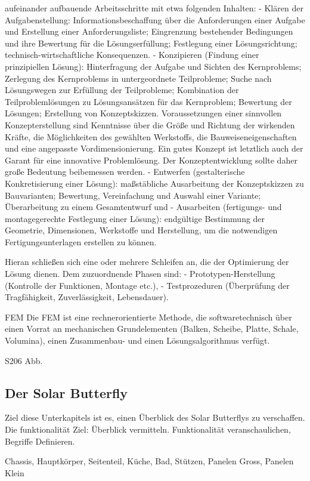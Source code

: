 aufeinander aufbauende Arbeitsschritte mit etwa folgenden Inhalten:
  - Klären der Aufgabenstellung: Informationsbeschaffung über die Anforderungen einer Aufgabe und Erstellung einer Anforderungsliste; Eingrenzung bestehender Bedingungen und ihre Bewertung für die Lösungserfüllung; Festlegung einer Lösungsrichtung; technisch-wirtschaftliche Konsequenzen.
  - Konzipieren (Findung einer prinzipiellen Lösung): Hinterfragung der Aufgabe und Sichten des Kernproblems; Zerlegung des Kernproblems in untergeordnete Teilprobleme; Suche nach Lösungswegen zur Erfüllung der Teilprobleme; Kombination der Teilproblemlösungen zu Lösungsansätzen für das Kernproblem; Bewertung der Lösungen; Erstellung von Konzeptskizzen. Voraussetzungen einer sinnvollen Konzepterstellung sind Kenntnisse über die Größe und Richtung der wirkenden Kräfte, die Möglichkeiten des gewählten Werkstoffs, die Bauweiseneigenschaften und eine angepasste Vordimensionierung. Ein gutes Konzept ist letztlich auch der Garant für eine innovative Problemlösung. Der Konzeptentwicklung sollte daher große Bedeutung beibemessen werden.
  - Entwerfen (gestalterische Konkretisierung einer Lösung): maßstäbliche Ausarbeitung der Konzeptskizzen zu Bauvarianten; Bewertung, Vereinfachung und Auswahl einer Variante; Überarbeitung zu einem Gesamtentwurf und
  - Ausarbeiten (fertigungs- und montagegerechte Festlegung einer Lösung): endgültige Bestimmung der Geometrie, Dimensionen, Werkstoffe und Herstellung, um die notwendigen Fertigungsunterlagen erstellen zu können.

Hieran schließen sich eine oder mehrere Schleifen an, die der Optimierung der Lösung dienen. Dem zuzuordnende Phasen sind:
  - Prototypen-Herstellung (Kontrolle der Funktionen, Montage etc.),
  - Testprozeduren (Überprüfung der Tragfähigkeit, Zuverlässigkeit, Lebensdauer).

FEM
  Die FEM ist eine rechnerorientierte Methode, die softwaretechnisch über einen Vorrat an mechanischen Grundelementen (Balken, Scheibe, Platte, Schale, Volumina), einen Zusammenbau- und einen Lösungsalgorithmus verfügt.

S206 Abb.

\subsection{Der Solar Butterfly}
Ziel diese Unterkapitels ist es, einen Überblick des Solar Butterflys zu verschaffen. Die funktionalität
Ziel: Überblick vermitteln. Funktionalität veranschaulichen, Begriffe Definieren.

Chassis, Hauptkörper, Seitenteil, Küche, Bad, Stützen, Panelen Gross, Panelen Klein

\newpage

